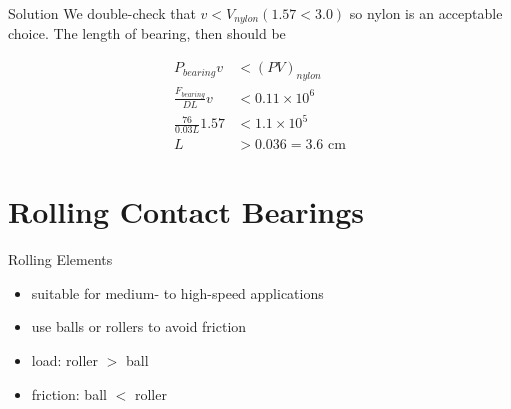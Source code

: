 \documentclass[10pt, svgnames]{beamer}
\begin{document}
\begin{frame}[label={sec:orgd3f0d32}]{Solution}
We double-check that \(v < V_{nylon} (1.57 < 3.0)\) so nylon is an acceptable choice. The length of bearing, then should be

\begin{align*}
    P_{bearing}v &< (PV)_{nylon} \\
    \frac{F_{bearing}}{DL}v &< 0.11 \times 10^6 \\
    \frac{76}{0.03L} 1.57 &< 1.1 \times 10^5 \\
    L &> 0.036 = 3.6 \text{ cm}
\end{align*}
\end{frame}

\section{Rolling Contact Bearings}
\label{sec:org79d1178}

\begin{frame}[label={sec:org8ad564a}]{Rolling Elements}
\begin{itemize}
\item suitable for medium- to high-speed applications
\item use balls or rollers to avoid friction
\item load: roller \(>\) ball
\item friction: ball \(<\) roller
\end{itemize}
\end{frame}
\end{document}
